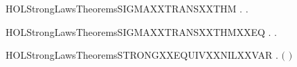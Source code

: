 \begin{SaveVerbatim}{HOLStrongLawsTheoremsSIGMAXXTRANSXXTHM}
\HOLTokenTurnstile{} \HOLSymConst{\HOLTokenForall{}}   . \HOLConst{\HOLTokenSum{}}   \HOLTokenTransBegin{}\HOLTokenTransEnd {} \HOLSymConst{\HOLTokenImp{}} \HOLSymConst{\HOLTokenExists{}}.  \HOLSymConst{\HOLTokenLeq{}}  \HOLSymConst{\HOLTokenConj{}}   \HOLTokenTransBegin{}\HOLTokenTransEnd {}
\end{SaveVerbatim}
\newcommand{\HOLStrongLawsTheoremsSIGMAXXTRANSXXTHM}{\UseVerbatim{HOLStrongLawsTheoremsSIGMAXXTRANSXXTHM}}
\begin{SaveVerbatim}{HOLStrongLawsTheoremsSIGMAXXTRANSXXTHMXXEQ}
\HOLTokenTurnstile{} \HOLSymConst{\HOLTokenForall{}}   . \HOLConst{\HOLTokenSum{}}   \HOLTokenTransBegin{}\HOLTokenTransEnd {} \HOLSymConst{\HOLTokenEquiv{}} \HOLSymConst{\HOLTokenExists{}}.  \HOLSymConst{\HOLTokenLeq{}}  \HOLSymConst{\HOLTokenConj{}}   \HOLTokenTransBegin{}\HOLTokenTransEnd {}
\end{SaveVerbatim}
\newcommand{\HOLStrongLawsTheoremsSIGMAXXTRANSXXTHMXXEQ}{\UseVerbatim{HOLStrongLawsTheoremsSIGMAXXTRANSXXTHMXXEQ}}
\begin{SaveVerbatim}{HOLStrongLawsTheoremsSTRONGXXEQUIVXXNILXXVAR}
\HOLTokenTurnstile{} \HOLSymConst{\HOLTokenForall{}}.   \ensuremath{(} \ensuremath{)}
\end{SaveVerbatim}
\newcommand{\HOLStrongLawsTheoremsSTRONGXXEQUIVXXNILXXVAR}{\UseVerbatim{HOLStrongLawsTheoremsSTRONGXXEQUIVXXNILXXVAR}}
